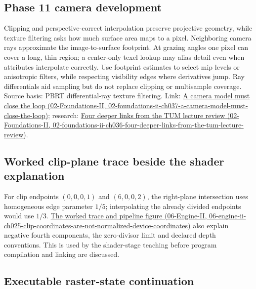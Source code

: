 \subsection{Phase 11 camera development}\label{appendix-40426e4b2103-phase-11-camera-development}

Clipping and perspective-correct interpolation preserve projective geometry, while texture filtering asks how much surface area maps to a pixel. Neighboring camera rays approximate the image-to-surface footprint. At grazing angles one pixel can cover a long, thin region; a center-only texel lookup may alias detail even when attributes interpolate correctly. Use footprint estimates to select mip levels or anisotropic filters, while respecting visibility edges where derivatives jump. Ray differentials aid sampling but do not replace clipping or multisample coverage. Source basis: PBRT differential-ray texture filtering. Link: \href{../02-Foundations-II/main.pdf\#nameddest=02-foundations-ii-ch037-a-camera-model-must-close-the-loop}{A camera model must close the loop (02-Foundations-II, 02-foundations-ii-ch037-a-camera-model-must-close-the-loop)}; research: \href{../02-Foundations-II/main.pdf\#nameddest=02-foundations-ii-ch036-four-deeper-links-from-the-tum-lecture-review}{Four deeper links from the TUM lecture review (02-Foundations-II, 02-foundations-ii-ch036-four-deeper-links-from-the-tum-lecture-review)}.

\subsection{Worked clip-plane trace beside the shader explanation}\label{appendix-40426e4b2103-worked-clip-plane-trace-beside-the-shader-explanation}

For clip endpoints \((0,0,0,1)\) and \((6,0,0,2)\), the right-plane intersection uses homogeneous edge parameter \(1/5\); interpolating the already divided endpoints would use \(1/3\). \href{../06-Engine-II/main.pdf\#nameddest=06-engine-ii-ch025-clip-coordinates-are-not-normalized-device-coordinates}{The worked trace and pipeline figure (06-Engine-II, 06-engine-ii-ch025-clip-coordinates-are-not-normalized-device-coordinates)} also explain negative fourth components, the zero-divisor limit and declared depth conventions. This is used by the shader-stage teaching before program compilation and linking are discussed.

\subsection{Executable raster-state continuation}\label{appendix-40426e4b2103-executable-raster-state-continuation}

